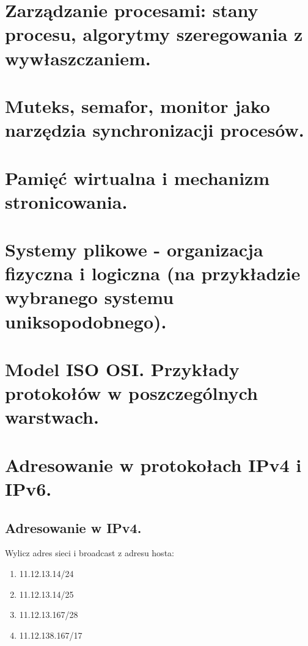 \documentclass[main.tex]{subfiles}
\begin{document}
    \section{Zarządzanie procesami: stany procesu, algorytmy szeregowania z wywłaszczaniem.}
    \section{Muteks, semafor, monitor jako narzędzia synchronizacji procesów.}
    \section{Pamięć wirtualna i mechanizm stronicowania.}
    \section{Systemy plikowe - organizacja fizyczna i logiczna (na przykładzie wybranego systemu uniksopodobnego).}
    \section{Model ISO OSI. Przykłady protokołów w poszczególnych warstwach.}

    \newpage

    \section{Adresowanie w protokołach IPv4 i IPv6.}

    \subsection{Adresowanie w IPv4.}

    \begin{exercise}
        Wylicz adres sieci i broadcast z adresu hosta:
        \begin{enumerate}
            \item 11.12.13.14/24
            \item 11.12.13.14/25
            \item 11.12.13.167/28
            \item 11.12.138.167/17
        \end{enumerate}
    \end{exercise}
\end{document}
